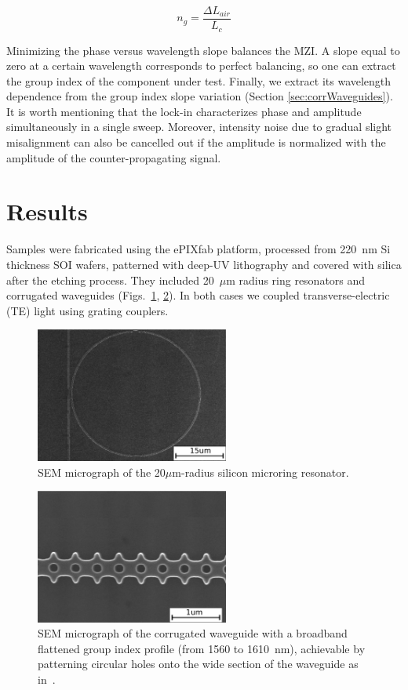 \documentclass[journal]{IEEEtran}
\begin{document}
\begin{equation}
  n_{g} = \frac{\Delta L_{air}}{L_{c}}
  \label{eq:group_index_pathBalancing}
\end{equation}

Minimizing the phase versus wavelength slope balances the MZI.
A slope equal to zero at a certain wavelength corresponds to perfect balancing, so one can extract the group index of the component under test.
Finally, we extract its wavelength dependence from the group index slope variation (Section \ref{sec:corrWaveguides}).
It is worth mentioning that the lock-in characterizes phase and amplitude simultaneously in a single sweep.
Moreover, intensity noise due to gradual slight misalignment can also be cancelled out if the amplitude is normalized with the amplitude of the counter-propagating signal.

\section{Results}
Samples were fabricated using the ePIXfab platform, processed from 220~nm Si thickness SOI wafers, patterned with deep-UV lithography and covered with silica after the etching process.
They included 20~$\mu$m radius ring resonators and corrugated waveguides (Figs.~\ref{fig:semRingPaperRings}, \ref{fig:sem}).
In both cases we coupled transverse-electric (TE) light using grating couplers.

\begin{figure}[htb]
    \centering
    \includegraphics[width=2.5in]{ringTEscale2}
    \caption{SEM micrograph of the 20$\mu$m-radius silicon microring resonator.}
    \label{fig:semRingPaperRings}
\end{figure}


\begin{figure}[htb]
	\centering
	\includegraphics[width=2.5in]{corrTEscale}	
	\caption{SEM micrograph of the corrugated waveguide with a broadband flattened group index profile (from 1560 to 1610~nm), achievable by patterning circular holes onto the wide section of the waveguide as in~\cite{Brimont2010}.}
	\label{fig:sem}
 \end{figure} 
\end{document}
